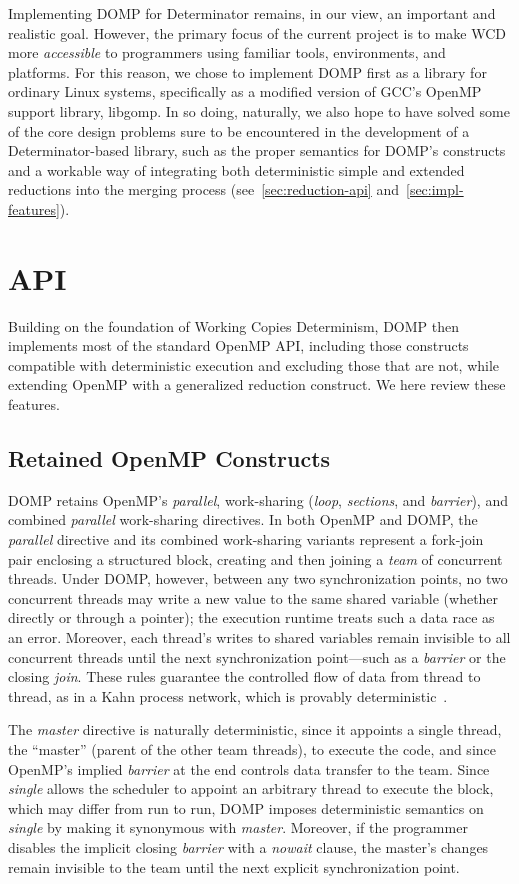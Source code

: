 Implementing DOMP for Determinator remains, in our view, an important and realistic goal.  However, the primary focus of the current project is to make WCD more \textit{accessible} to programmers using familiar tools, environments, and platforms.  For this reason, we chose to implement DOMP first as a library for ordinary Linux systems, specifically as a modified version of GCC's OpenMP support library, libgomp.  In so doing, naturally, we also hope to have solved some of the core design problems sure to be encountered in the development of a Determinator-based library, such as the proper semantics for DOMP's constructs and a workable way of integrating both deterministic simple and extended reductions into the merging process (see~\ref{sec:reduction-api} and~\ref{sec:impl-features}).
%
\section{API}
\label{sec:design-api}
Building on the foundation of Working Copies Determinism, DOMP then implements most of the standard OpenMP API, including those constructs compatible with deterministic execution and excluding those that are not, while extending OpenMP with a generalized reduction construct.  We here review these features.

\subsection{Retained OpenMP Constructs}
\label{subsec:domp-included}
DOMP retains OpenMP's \textit{parallel}, work-sharing (\textit{loop}, \textit{sections}, and \textit{barrier}), and combined \textit{parallel} work-sharing directives.  In both OpenMP and DOMP, the \textit{parallel} directive and its combined work-sharing variants represent a fork-join pair enclosing a structured block, creating and then joining a \textit{team} of concurrent threads.  Under DOMP, however, between any two synchronization points, no two concurrent threads may write a new value to the same shared variable (whether directly or through a pointer); the execution runtime treats such a data race as an error.  Moreover, each thread's writes to shared variables remain invisible to all concurrent threads until the next synchronization point---such as a \textit{barrier} or the closing \textit{join}.  These rules guarantee the controlled flow of data from thread to thread, as in a Kahn process network, which is provably deterministic~\cite{kahn74semantics}.

The \textit{master} directive is naturally deterministic, since it appoints a single thread, the ``master'' (parent of the other team threads), to execute the code, and since OpenMP's implied \textit{barrier} at the end controls data transfer to the team.   Since \textit{single} allows the scheduler to appoint an arbitrary thread to execute the block, which may differ from run to run, DOMP imposes deterministic semantics on \textit{single} by making it synonymous with \textit{master}.  Moreover, if the programmer disables the implicit closing \textit{barrier} with a \textit{nowait} clause, the master's changes remain invisible to the team until the next explicit synchronization point.


